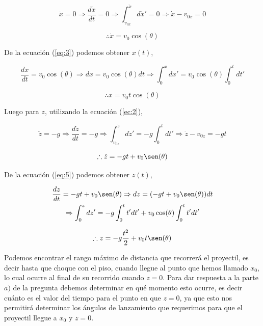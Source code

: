 \documentclass[a4paper,10pt]{article}
\begin{document}
\begin{equation*}
 \ddot{x} = 0 \Rightarrow \frac{d\dot{x}}{dt} = 0 \Rightarrow 
 \int_{v_{0x}}^{\dot{x}}d\dot{x}' = 0 \Rightarrow \dot{x} - v_{0x} = 0 
 \end{equation*}

\begin{equation}
 \therefore \dot{x} = v_0 \cos(\theta)
 \label{eq:3}
\end{equation}

De la ecuación (\ref{eq:3}) podemos obtener $x(t)$, 

\begin{equation*}
 \frac{dx}{dt} = v_0 \cos(\theta) \Rightarrow dx = v_0 \cos(\theta) dt \Rightarrow
 \int_0^x dx' = v_0 \cos(\theta) \int_0^t dt'
\end{equation*}

\begin{equation}
 \therefore x = v_0 t \cos(\theta)
 \label{eq:4}
\end{equation}

Luego para $z$, utilizando la ecuación (\ref{ec:2}),

\begin{equation*}
 \ddot{z} = -g \Rightarrow \frac{d\dot{z}}{dt} = -g \Rightarrow 
 \int_{v_{0z}}^{\dot{z}}d\dot{z}' = -g \int_0^t dt' \Rightarrow \dot{z} - v_{0z} = -gt 
 \end{equation*}
 
\begin{equation}
 \therefore \dot{z} = -gt + v_0 \sen(\theta)
 \label{eq:5}
\end{equation}

De la ecuación (\ref{eq:5}) podemos obtener $z(t)$,

\begin{gather*}
 \frac{dz}{dt} = -gt + v_0 \sen(\theta) \Rightarrow dz = (-gt + v_0 \sen(\theta)) dt \\ \Rightarrow
 \int_0^z dz' = -g\int_0^t t' dt' + v_0 \cos(\theta) \int_0^t t'dt'
\end{gather*}

\begin{equation}
 \therefore z = - g \frac{t^2}{2} + v_0 t \sen(\theta)
 \label{eq:6}
\end{equation}

Podemos encontrar el rango máximo de distancia que recorrerá el proyectil, 
es decir hasta que choque con el piso, cuando llegue al punto que hemos llamado
$x_0$, lo cual ocurre al final de su recorrido cuando $z=0$. Para dar
respuesta a la parte $a)$ de la pregunta debemos determinar en qué momento
esto ocurre, es decir cuánto es el valor del tiempo para el punto en que 
$z=0$, ya que esto nos permitirá determinar los ángulos de lanzamiento
que requerimos para que el proyectil llegue a $x_0$ y $z=0$.
\end{document}
